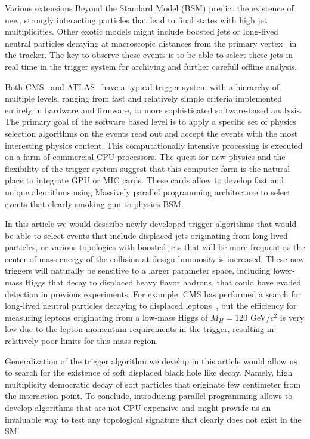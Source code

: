 \documentclass{JINST}
\begin{document}
Various extensions Beyond the Standard Model (BSM) predict the existence of new, strongly interacting particles that lead to final states
with high jet multiplicities. Other exotic models might include boosted jets or long-lived neutral particles decaying
at macroscopic distances from the primary vertex~\cite{bib:hiddenvalley} in the tracker. The key to observe these events is to be
able to select these jets in real time in the trigger system for archiving and further carefull offline analysis.

Both CMS~\cite{Chatrchyan:2008aa} and ATLAS~\cite{Aad:2008zzm} have a typical trigger system with a hierarchy of multiple levels, 
ranging from fast and relatively simple criteria implemented entirely in hardware and firmware, to more sophisticated software-based analysis. 
The primary goal of the software based level is to apply a specific set of 
physics selection algorithms on the events read out and accept the events with the most interesting physics 
content. This computationally intensive processing is executed on a farm of commercial CPU processors.
The quest for new physics and the flexibility of the trigger system suggest that this computer farm is the natural
place to integrate GPU or MIC cards. These cards allow to develop fast and unique algorithms using Massively parallel programming architecture
to select events that clearly smoking gun to physics BSM. 

In this article we would describe newly developed trigger algorithms that would be able to select events
that include displaced jets originating from long lived particles, or various topologies with boosted jets that will
be more frequent as the center of mass energy of the collision at design luminosity is increased. These new
triggers will naturally be sensitive to a larger parameter space, including lower-mass Higgs that decay to
displaced heavy flavor hadrons, that could have evaded detection in previous experiments. For example, CMS has 
performed a search for long-lived neutral particles decaying to displaced leptons~\cite{Chatrchyan:2012jna}, 
but the efficiency for measuring leptons originating from a low-mass Higgs of $M_H = 120$ GeV/$c^2$ is very low 
due to the lepton momentum requirements in the trigger, resulting in relatively poor limits for this mass region.

Generalization of the trigger algorithm we develop in this article would allow us to search for 
 the existence of soft displaced black hole like decay. Namely, high multiplicity democratic decay of soft particles  
that originate few centimeter from the interaction point. To conclude, 
introducing parallel programming allows to develop algorithms that are not CPU expensive and
might provide us an invaluable way to test any topological signature that clearly does not exist in the SM.
\end{document}
